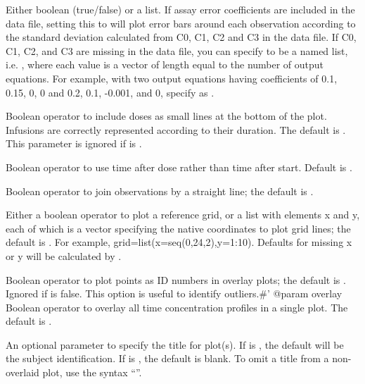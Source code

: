 \documentclass[a4paper]{book}
\begin{document}
\begin{Arguments}
\begin{ldescription}
\item[\code{errbar}] Either boolean (true/false) or a list.  If assay error coefficients are included
in the data file, setting this to  will plot error bars around each observation
according to the standard deviation calculated from C0, C1, C2 and C3 in the data file.
If C0, C1, C2, and C3 are missing in the data file, you can specify  to be a named list,
i.e. , where each value is a vector of length equal to the number of
output equations.  For example, with two output equations having coefficients of 
0.1, 0.15, 0, 0 and 0.2, 0.1, -0.001, and 0, specify as .

\item[\code{doses}] Boolean operator to include doses as small lines at the bottom of the plot.
Infusions are correctly represented according to their duration.  The default is .
This parameter is ignored if  is .

\item[\code{tad}] Boolean operator to use time after dose rather than time after start.  Default is .

\item[\code{join}] Boolean operator to join observations by a straight line; the default is .

\item[\code{grid}] Either a boolean operator to plot a reference grid, or a list with elements x and y,
each of which is a vector specifying the native coordinates to plot grid lines; the default is .
For example, grid=list(x=seq(0,24,2),y=1:10).  Defaults for missing x or y will be calculated by .

\item[\code{ident}] Boolean operator to plot points as ID numbers in overlay plots; the default is .  Ignored if  is false.
This option is useful to identify outliers.\#' @param overlay Boolean operator to overlay all time concentration profiles in a single plot.
The default is .

\item[\code{main}] An optional parameter to specify the title for plot(s).  If  is ,
the default will be the subject identification. If  is , the default is blank.
To omit a title from a non-overlaid plot, use the syntax ``''.


\end{ldescription}
\end{Arguments}
\end{document}
